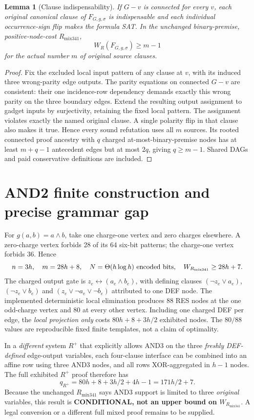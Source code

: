 \documentclass[11pt]{article}
\newtheorem{lemma}{Lemma}
\begin{document}
\begin{lemma}[Clause indispensability]
If $G-v$ is connected for every $v$, each original canonical clause of $F_{G,g,\sigma}$ is indispensable and each individual occurrence-sign flip makes the formula SAT. In the unchanged binary-premise, positive-node-cost $R_{\mathrm{mix341}}$,
\[
\boxed{W_R(F_{G,g,\sigma})\ge m-1}
\]
for the actual number $m$ of original source clauses.
\end{lemma}
\begin{proof}
Fix the excluded local input pattern of any clause at $v$, with its induced three wrong-parity edge outputs. The parity equations on connected $G-v$ are consistent: their one incidence-row dependency demands exactly this wrong parity on the three boundary edges. Extend the resulting output assignment to gadget inputs by surjectivity, retaining the fixed local pattern. The assignment violates exactly the named original clause. A single polarity flip in that clause also makes it true. Hence every sound refutation uses all $m$ sources. Its rooted connected proof ancestry with $q$ charged at-most-binary-premise nodes has at least $m+q-1$ antecedent edges but at most $2q$, giving $q\ge m-1$. Shared DAGs and paid conservative definitions are included.
\end{proof}

\section*{AND2 finite construction and precise grammar gap}
For $g(a,b)=a\wedge b$, take one charge-one vertex and zero charges elsewhere. A zero-charge vertex forbids 28 of its 64 six-bit patterns; the charge-one vertex forbids 36. Hence
\[
n=3h,\quad m=28h+8,\quad N=\Theta(h\log h)\ {\rm encoded\ bits},\quad W_{R_{\mathrm{mix341}}}\ge28h+7.
\]
The charged output gate is $z_e\leftrightarrow (a_e\wedge b_e)$, with defining clauses $(\neg z_e\vee a_e)$, $(\neg z_e\vee b_e)$ and $(z_e\vee\neg a_e\vee\neg b_e)$ attributed to one DEF node. The implemented deterministic local elimination produces 88 RES nodes at the one odd-charge vertex and 80 at every other vertex. Including one charged DEF per edge, the \emph{local projection only} costs $80h+8+3h/2$ exhibited nodes. The $80/88$ values are reproducible fixed finite templates, not a claim of optimality.

In a \emph{different} system $R^+$ that explicitly allows AND3 on the three \emph{freshly DEF-defined} edge-output variables, each four-clause interface can be combined into an affine row using three AND3 nodes, and all rows XOR-aggregated in $h-1$ nodes. The full exhibited $R^+$ proof therefore has
\[
q_{R^+}=80h+8+3h/2+4h-1=171h/2+7.
\]
Because the unchanged $R_{\mathrm{mix341}}$ says AND3 support is limited to three \emph{original} variables, this result is \textbf{CONDITIONAL, not an upper bound on $W_{R_{\mathrm{mix341}}}$}. A legal conversion or a different full mixed proof remains to be supplied.
\end{document}
